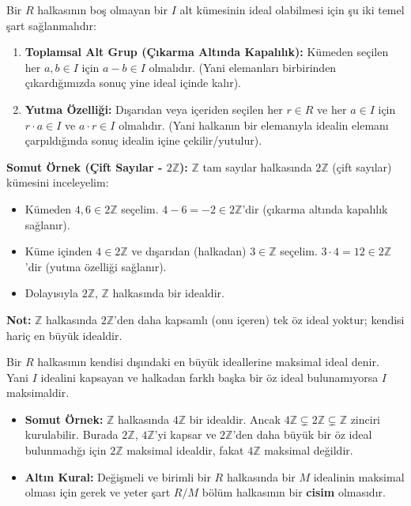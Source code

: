 \documentclass[11pt, a4paper]{article}
\begin{document}
\begin{konubox}[title=\faBook\enspace 2. İdeallik (Ideal)]
Bir $R$ halkasının boş olmayan bir $I$ alt kümesinin ideal olabilmesi için şu iki temel şart sağlanmalıdır:
\begin{enumerate}
    \item \textbf{Toplamsal Alt Grup (Çıkarma Altında Kapalılık):} Kümeden seçilen her $a, b \in I$ için $a - b \in I$ olmalıdır. (Yani elemanları birbirinden çıkardığımızda sonuç yine ideal içinde kalır).
    \item \textbf{Yutma Özelliği:} Dışarıdan veya içeriden seçilen her $r \in R$ ve her $a \in I$ için $r \cdot a \in I$ ve $a \cdot r \in I$ olmalıdır. (Yani halkanın bir elemanıyla idealin elemanı çarpıldığında sonuç idealin içine çekilir/yutulur).
\end{enumerate}
\textbf{Somut Örnek (Çift Sayılar - $2\mathbb{Z}$):} $\mathbb{Z}$ tam sayılar halkasında $2\mathbb{Z}$ (çift sayılar) kümesini inceleyelim:
\begin{itemize}
    \item Kümeden $4, 6 \in 2\mathbb{Z}$ seçelim. $4 - 6 = -2 \in 2\mathbb{Z}$'dir (çıkarma altında kapalılık sağlanır).
    \item Küme içinden $4 \in 2\mathbb{Z}$ ve dışarıdan (halkadan) $3 \in \mathbb{Z}$ seçelim. $3 \cdot 4 = 12 \in 2\mathbb{Z}$'dir (yutma özelliği sağlanır).
    \item Dolayısıyla $2\mathbb{Z}$, $\mathbb{Z}$ halkasında bir idealdir.
\end{itemize}
\textbf{Not:} $\mathbb{Z}$ halkasında $2\mathbb{Z}$'den daha kapsamlı (onu içeren) tek öz ideal yoktur; kendisi hariç en büyük idealdir.
\end{konubox}

\begin{konubox}[title=\faBook\enspace 3. Maksimal İdeal (Maximal Ideal)]
Bir $R$ halkasının kendisi dışındaki en büyük ideallerine maksimal ideal denir. Yani $I$ idealini kapsayan ve halkadan farklı başka bir öz ideal bulunamıyorsa $I$ maksimaldir.
\begin{itemize}
    \item \textbf{Somut Örnek:} $\mathbb{Z}$ halkasında $4\mathbb{Z}$ bir idealdir. Ancak $4\mathbb{Z} \subsetneq 2\mathbb{Z} \subsetneq \mathbb{Z}$ zinciri kurulabilir. Burada $2\mathbb{Z}$, $4\mathbb{Z}$'yi kapsar ve $2\mathbb{Z}$'den daha büyük bir öz ideal bulunmadığı için $2\mathbb{Z}$ maksimal idealdir, fakat $4\mathbb{Z}$ maksimal değildir.
    \item \textbf{Altın Kural:} Değişmeli ve birimli bir $R$ halkasında bir $M$ idealinin maksimal olması için gerek ve yeter şart $R/M$ bölüm halkasının bir \textbf{cisim} olmasıdır.
\end{itemize}
\end{konubox}
\end{document}
